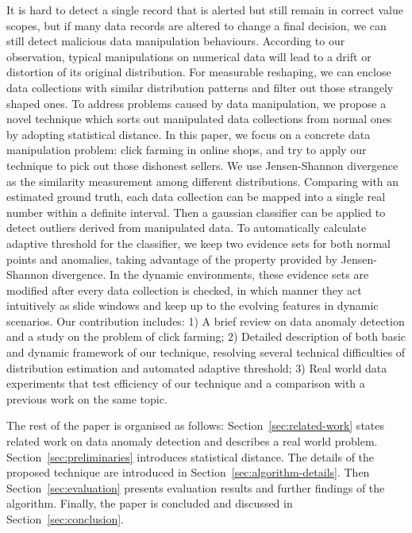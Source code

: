 \documentclass[10pt,conference,letterpaper]{IEEEtran}
\begin{document}
		It is hard to detect a single record that is alerted but still remain in correct value scopes, but if many data records are altered to change a final decision, we can still detect malicious data manipulation behaviours.
		According to our observation, typical manipulations on numerical data will lead to a drift or distortion of its original distribution. For measurable reshaping, we can enclose data collections with similar distribution patterns and filter out those strangely shaped ones. 
		To address problems caused by data manipulation, we propose a novel technique which sorts out manipulated data collections from normal ones by adopting statistical distance.
		In this paper, we focus on a concrete data manipulation problem: click farming in online shops, and try to apply our technique to pick out those dishonest sellers.
		We use Jensen-Shannon divergence as the similarity measurement among different distributions. Comparing with an estimated ground truth, each data collection can be mapped into a single real number within a definite interval. Then a gaussian classifier can be applied to detect outliers derived from manipulated data. To automatically calculate adaptive threshold for the classifier, we keep two evidence sets for both normal points and anomalies, taking advantage of the property provided by Jensen-Shannon divergence.
		In the dynamic environments, these evidence sets are modified after every data collection is checked, in which manner they act intuitively as slide windows and keep up to the evolving features in dynamic scenarios.
		Our contribution includes: 1) A brief review on data anomaly detection and a study on the problem of click farming; 2) Detailed description of both basic and dynamic framework of our technique, resolving several technical difficulties of distribution estimation and automated adaptive threshold; 3) Real world data experiments that test efficiency of our technique and a comparison with a previous work on the same topic.
		
		The rest of the paper is organised as follows: Section~\ref{sec:related-work} states related work on data anomaly detection and describes a real world problem. Section~\ref{sec:preliminaries} introduces statistical distance. The details of the proposed technique are introduced in Section~\ref{sec:algorithm-details}. Then Section~\ref{sec:evaluation} presents evaluation results and further findings of the algorithm. Finally, the paper is concluded and discussed in Section~\ref{sec:conclusion}.
		
\end{document}
